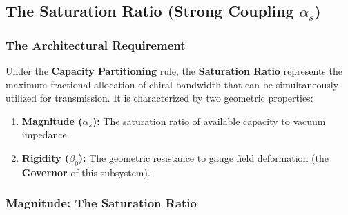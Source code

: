 \subsection{The Saturation Ratio (Strong Coupling \texorpdfstring{$\alpha_s$}{alpha\_s})}
\label{subsec:saturation_ratio}




\subsubsection{The Architectural Requirement}

Under the \textbf{Capacity Partitioning} rule, the \textbf{Saturation Ratio} represents the maximum fractional allocation of chiral bandwidth that can be simultaneously utilized for transmission. It is characterized by two geometric properties:
\begin{enumerate}
    \item \textbf{Magnitude ($\alpha_s$):} The saturation ratio of available capacity to vacuum impedance.
    \item \textbf{Rigidity ($\beta_0$):} The geometric resistance to gauge field deformation (the \textbf{Governor} of this subsystem).
\end{enumerate}

\subsubsection{Magnitude: The Saturation Ratio}

